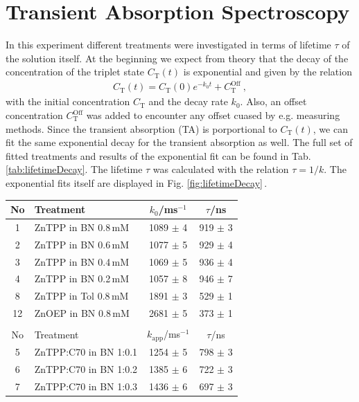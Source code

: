 \newpage
\section{Transient Absorption Spectroscopy}
\label{sec:transient}

In this experiment different treatments were investigated in terms of lifetime $\tau$ of the solution itself. At the beginning we expect from theory that the decay of the concentration of the triplet state $C_\mathrm{T}(t)$ is exponential and given by the relation
\begin{gather}
    C_\mathrm{T}(t) = C_\mathrm{T}(0) e^{-k_0 t} + C_\mathrm{T}^\mathrm{Off}~,
    \label{eq:fitExp}
\end{gather}
with the initial concentration $C_\mathrm{T}$ and the decay rate $k_0$. Also, an offset concentration $C_\mathrm{T}^\mathrm{Off}$ was added to encounter any offset cuased by e.g. measuring methods. Since the transient absorption (TA) is porportional to $C_\mathrm{T}(t)$, we can fit the same exponential decay for the transient absorption as well. The full set of fitted treatments and results of the exponential fit can be found in Tab. \ref{tab:lifetimeDecay}. The lifetime $\tau$ was calculated with the relation $\tau = 1/k$. The exponential fits itself are displayed in Fig. \ref{fig:lifetimeDecay}\,.
\begin{center}
    \captionsetup{type = table}
    \begin{tabular}{| c | l | c c |}
        \hline
        No & Treatment             & $k_0$/ms$^{-1}$            & $\tau$/ns   \\\hline
        1  & ZnTPP in BN 0.8\,mM   & 1089 $\pm$ 4               & 919 $\pm$ 3 \\
        2  & ZnTPP in BN 0.6\,mM   & 1077 $\pm$ 5               & 929 $\pm$ 4 \\
        3  & ZnTPP in BN 0.4\,mM   & 1069 $\pm$ 5               & 936 $\pm$ 4 \\
        4  & ZnTPP in BN 0.2\,mM   & 1057 $\pm$ 8               & 946 $\pm$ 7 \\\hline
        8  & ZnTPP in Tol 0.8\,mM  & 1891 $\pm$ 3               & 529 $\pm$ 1 \\\hline
        12 & ZnOEP in BN 0.8\,mM   & 2681 $\pm$ 5               & 373 $\pm$ 1 \\\hline
        \multicolumn{4}{c}{}\\\hline
        No & Treatment             & $k_\mathrm{app}$/ms$^{-1}$ & $\tau$/ns   \\\hline
        5  & ZnTPP:C70 in BN 1:0.1 & 1254 $\pm$ 5               & 798 $\pm$ 3 \\
        6  & ZnTPP:C70 in BN 1:0.2 & 1385 $\pm$ 6               & 722 $\pm$ 3 \\
        7  & ZnTPP:C70 in BN 1:0.3 & 1436 $\pm$ 6               & 697 $\pm$ 3 \\\hline
    \end{tabular}
    \label{tab:lifetimeDecay}
\end{center}

